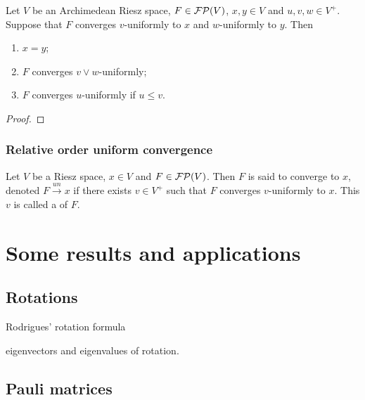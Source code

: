 \begin{lemma}
Let $V$ be an Archimedean Riesz space, $F\in\operatorname{\mathcal{FP}}(V)$, $x,y\in V$ and $u,v,w\in V^+$. Suppose that $F$ converges $v$-uniformly to $x$ and $w$-uniformly to $y$. Then
\begin{enumerate}
\item $x = y$;
\item $F$ converges $v \vee w$-uniformly;
\item $F$ converges $u$-uniformly if $u\leq v$.
\end{enumerate}
\end{lemma}
\begin{proof}

\end{proof}

\subsection{Relative order uniform convergence}
\begin{definition}
Let $V$ be a Riesz space, $x\in V$ and $F\in\operatorname{\mathcal{FP}}(V)$. Then $F$ is said to converge  to $x$, denoted $F\overset{un}{\longrightarrow} x$ if there exists $v\in V^+$ such that $F$ converges $v$-uniformly to $x$. This $v$ is called a  of $F$.
\end{definition}


\chapter{Some results and applications}
\section{Rotations}
Rodrigues' rotation formula

eigenvectors and eigenvalues of rotation.
\section{Pauli matrices}

